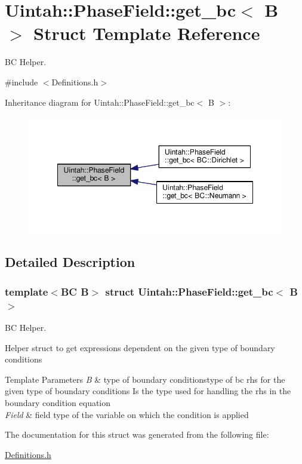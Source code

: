 \hypertarget{structUintah_1_1PhaseField_1_1get__bc}{}\section{Uintah\+:\+:Phase\+Field\+:\+:get\+\_\+bc$<$ B $>$ Struct Template Reference}
\label{structUintah_1_1PhaseField_1_1get__bc}


BC Helper.  




{\ttfamily \#include $<$Definitions.\+h$>$}



Inheritance diagram for Uintah\+:\+:Phase\+Field\+:\+:get\+\_\+bc$<$ B $>$\+:\nopagebreak
\begin{figure}[H]
\begin{center}
\leavevmode
\includegraphics[width=348pt]{structUintah_1_1PhaseField_1_1get__bc__inherit__graph}
\end{center}
\end{figure}


\subsection{Detailed Description}
\subsubsection*{template$<$BC B$>$\newline
struct Uintah\+::\+Phase\+Field\+::get\+\_\+bc$<$ B $>$}

BC Helper. 

Helper struct to get expressions dependent on the given type of boundary conditions


\begin{DoxyTemplParams}{Template Parameters}
{\em B} & type of boundary conditionstype of bc rhs for the given type of boundary conditions Is the type used for handling the rhs in the boundary condition equation \\
\hline
{\em Field} & field type of the variable on which the condition is applied \\
\hline
\end{DoxyTemplParams}


The documentation for this struct was generated from the following file\+:\begin{DoxyCompactItemize}
\item 
\hyperlink{Definitions_8h}{Definitions.\+h}\end{DoxyCompactItemize}

